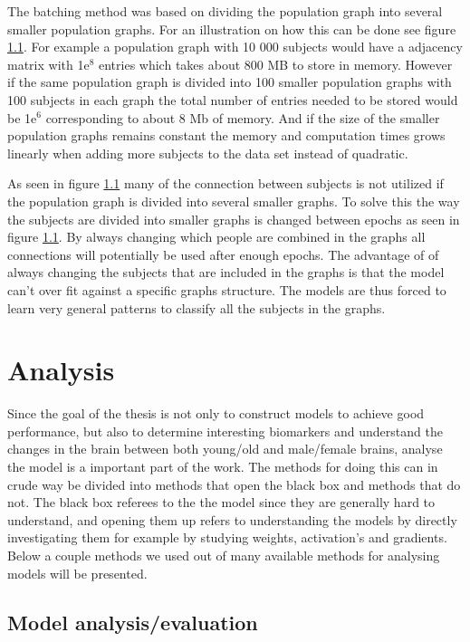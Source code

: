 The batching method was based on dividing the population graph into several smaller population graphs. For an illustration on how this can be done see figure \ref{}. For example a population graph with 10 000 subjects would have a adjacency matrix with 1e$^8$ entries which takes about 800 MB to store in memory. However if the same population graph is divided into 100 smaller population graphs with 100 subjects in each graph the total number of entries needed to be stored would be 1e$^6$ corresponding to about 8 Mb of memory. And if the size of the smaller population graphs remains constant the memory and computation times grows linearly when adding more subjects to the data set instead of quadratic.

As seen in figure \ref{} many of the connection between subjects is not utilized if the population graph is divided into several smaller graphs. To solve this the way the subjects are divided into smaller graphs is changed between epochs as seen in figure \ref{}. By always changing which people are combined in the graphs all connections will potentially be used after enough epochs. The advantage of of always changing the subjects that are included in the graphs is that the model can't over fit against a specific graphs structure. The models are thus forced to learn very general patterns to classify all the subjects in the graphs. 




\section{Analysis}
Since the goal of the thesis is not only to construct models to achieve good performance, but also to determine interesting biomarkers and understand the changes in the brain between both young/old and male/female brains, analyse the model is a important part of the work. The methods for doing this can in crude way be divided into methods that open the black box and methods that do not. The black box referees to the the model since they are generally hard to understand, and opening them up refers to understanding the models by directly investigating them for example by studying weights, activation's and gradients. Below a couple methods we used out of many available methods for analysing models will be presented. 


\subsection{Model analysis/evaluation}

